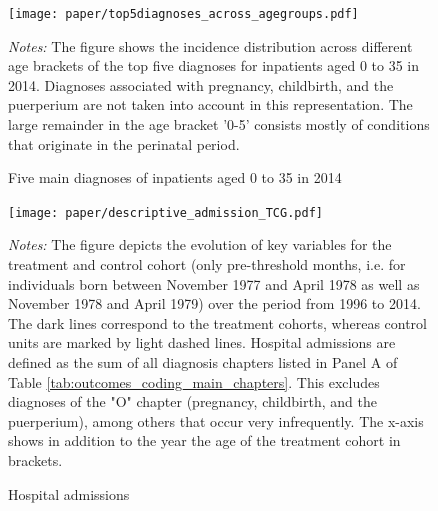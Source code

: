 \documentclass[11pt, a4paper,draft]{article} %
\begin{document}
\vspace*{\fill}
\begin{figure}[H]\centering
	\caption{Five main diagnoses of inpatients aged 0 to 35 in 2014}\label{fig: top5diagnosis_in_2014_across_agegroups}
	\texttt{[image: paper/top5diagnoses\_across\_agegroups.pdf]}
	\begin{minipage}{\linewidth}
		\scriptsize{\emph{Notes:} The figure shows the incidence distribution across different age brackets of the top five diagnoses for inpatients aged 0 to 35 in 2014. Diagnoses associated with pregnancy, childbirth, and the puerperium are not taken into account in this representation. The large remainder in the age bracket '0-5' consists mostly of conditions that originate in the perinatal period.}
	\end{minipage}
\end{figure}
\vspace*{\fill}\clearpage
\newpage
\vspace*{\fill}
\begin{figure}[H]\centering
	\caption{Hospital admissions}\label{fig: descriptive_hospital_admission}
	\texttt{[image: paper/descriptive\_admission\_TCG.pdf]}
	\begin{minipage}{\linewidth}
		\scriptsize{\emph{Notes:} The figure depicts the evolution of key variables for the treatment and control cohort (only pre-threshold months, i.e. for individuals born between November 1977 and April 1978 as well as November 1978 and April 1979) over the period from 1996 to 2014. The dark lines correspond to the treatment cohorts, whereas control units are marked by light dashed lines. Hospital admissions are defined as the sum of all diagnosis chapters listed in Panel A of Table \ref{tab:outcomes_coding_main_chapters}. This excludes diagnoses of the "O" chapter (pregnancy, childbirth, and the puerperium), among others that occur very infrequently. The x-axis shows in addition to the year the age of the treatment cohort in brackets.} 
	\end{minipage}
\end{figure}
\vspace*{\fill}\clearpage
\end{document}
